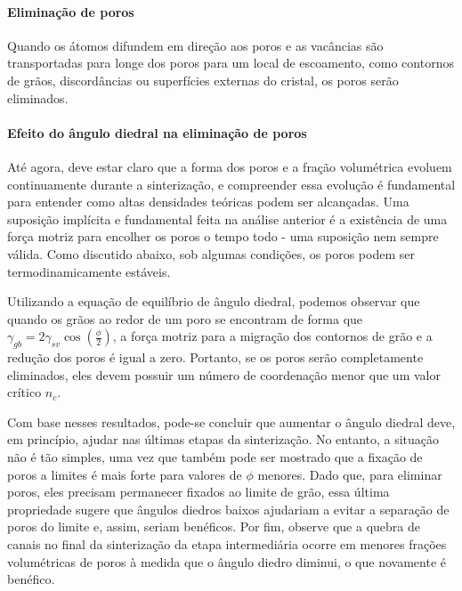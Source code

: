 \paragraph*{Eliminação de poros}

Quando os átomos difundem em direção aos poros e as vacâncias são transportadas para longe dos poros para um local de escoamento, como contornos de grãos, discordâncias ou superfícies externas do cristal, os poros serão eliminados.

\paragraph*{Efeito do ângulo diedral na eliminação de poros}

Até agora, deve estar claro que a forma dos poros e a fração volumétrica evoluem continuamente durante a sinterização, e compreender essa evolução é fundamental para entender como altas densidades teóricas podem ser alcançadas. Uma suposição implícita e fundamental feita na análise anterior é a existência de uma força motriz para encolher os poros o tempo todo - uma suposição nem sempre válida. Como discutido abaixo, sob algumas condições, os poros podem ser termodinamicamente estáveis.

Utilizando a equação de equilíbrio de ângulo diedral, podemos observar que quando os grãos ao redor de um poro se encontram de forma que $\displaystyle \gamma_{gb} = 2\gamma_{sv} \cos(\frac{\phi}{2})$, a força motriz para a migração dos contornos de grão e a redução dos poros é igual a zero. Portanto, se os poros serão completamente eliminados, eles devem possuir um número de coordenação menor que um valor crítico $n_c$.

Com base nesses resultados, pode-se concluir que aumentar o ângulo diedral deve, em princípio, ajudar nas últimas etapas da sinterização. No entanto, a situação não é tão simples, uma vez que também pode ser mostrado que a fixação de poros a limites é mais forte para valores de $\phi$ menores. Dado que, para eliminar poros, eles precisam permanecer fixados ao limite de grão, essa última propriedade sugere que ângulos diedros baixos ajudariam a evitar a separação de poros do limite e, assim, seriam benéficos. Por fim, observe que a quebra de canais no final da sinterização da etapa intermediária ocorre em menores frações volumétricas de poros à medida que o ângulo diedro diminui, o que novamente é benéfico.

